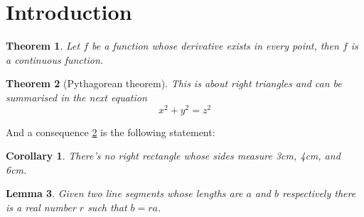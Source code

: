 \documentclass{article}
\begin{document}
\section{Introduction}
\newtheorem{theorem}{Theorem}[section]
\newtheorem{corollary}{Corollary}[theorem]
\newtheorem{lemma}[theorem]{Lemma}

\begin{theorem}
Let \(f\) be a function whose derivative exists in every point, then \(f\) is a continuous function.
\end{theorem}

\begin{theorem}[Pythagorean theorem]
\label{pythagorean}	
This is about right triangles and can be summarised in the next equation \[ x^2 + y^2 = z^2 \]
\end{theorem}

And a consequence \ref{pythagorean} is the following statement:

\begin{corollary}
There's no right rectangle whose sides measure 3cm, 4cm, and 6cm.
\end{corollary}

\begin{lemma}
Given two line segments whose lengths are \(a\) and \(b\) respectively there is a real number \(r\) such that \(b=ra\).
\end{lemma}
\end{document}
